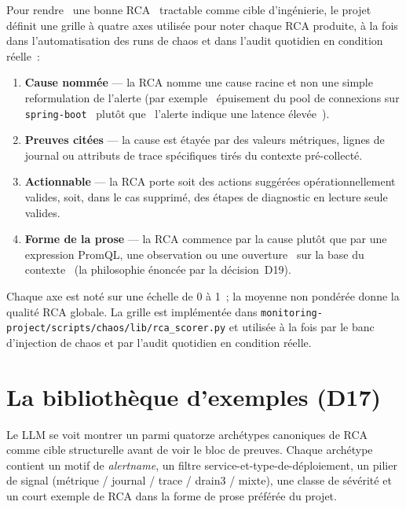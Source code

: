 \documentclass[11pt,a4paper,oneside]{report}
\begin{document}
Pour rendre \og~une bonne RCA~\fg{} tractable comme cible
d'ingénierie, le projet définit une grille à quatre axes utilisée
pour noter chaque RCA produite, à la fois dans l'automatisation des
runs de chaos et dans l'audit quotidien en condition réelle~:

\begin{enumerate}
  \item \textbf{Cause nommée} --- la RCA nomme une cause racine et
        non une simple reformulation de l'alerte (par exemple
        \og~épuisement du pool de connexions sur
        \texttt{spring-boot}~\fg{} plutôt que \og~l'alerte indique
        une latence élevée~\fg{}).
  \item \textbf{Preuves citées} --- la cause est étayée par des
        valeurs métriques, lignes de journal ou attributs de trace
        spécifiques tirés du contexte pré-collecté.
  \item \textbf{Actionnable} --- la RCA porte soit des actions
        suggérées opérationnellement valides, soit, dans le cas
        supprimé, des étapes de diagnostic en lecture seule
        valides.
  \item \textbf{Forme de la prose} --- la RCA commence par la cause
        plutôt que par une expression PromQL, une observation ou
        une ouverture \og~sur la base du contexte~\fg{} (la
        philosophie énoncée par la décision~D19).
\end{enumerate}

Chaque axe est noté sur une échelle de 0 à 1~; la moyenne non
pondérée donne la qualité RCA globale. La grille est implémentée
dans
\texttt{monitoring-project/scripts/chaos/lib/rca\_scorer.py} et
utilisée à la fois par le banc d'injection de chaos et par l'audit
quotidien en condition réelle.

\section{La bibliothèque d'exemples (D17)}

\begin{notebox}[title={Décision D17 --- injection d'exemplaires}]
Le LLM se voit montrer un parmi quatorze archétypes canoniques de
RCA comme cible structurelle avant de voir le bloc de preuves.
Chaque archétype contient un motif de \emph{alertname}, un filtre
service-et-type-de-déploiement, un pilier de signal (métrique /
journal / trace / drain3 / mixte), une classe de sévérité et un
court exemple de RCA dans la forme de prose préférée du projet.
\end{notebox}
\end{document}

